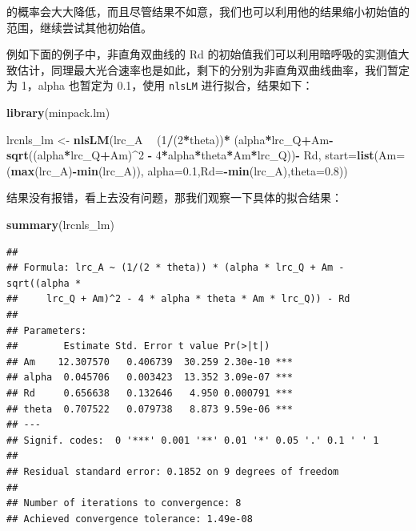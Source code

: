 \documentclass[]{krantz}
\makeatletter
\newenvironment{Shaded}{\begin{snugshade}}{\end{snugshade}}
\newcommand{\KeywordTok}[1]{\textcolor[rgb]{0.13,0.29,0.53}{\textbf{#1}}}
\newcommand{\DataTypeTok}[1]{\textcolor[rgb]{0.13,0.29,0.53}{#1}}
\newcommand{\DecValTok}[1]{\textcolor[rgb]{0.00,0.00,0.81}{#1}}
\newcommand{\FloatTok}[1]{\textcolor[rgb]{0.00,0.00,0.81}{#1}}
\newcommand{\StringTok}[1]{\textcolor[rgb]{0.31,0.60,0.02}{#1}}
\newcommand{\OperatorTok}[1]{\textcolor[rgb]{0.81,0.36,0.00}{\textbf{#1}}}
\newcommand{\NormalTok}[1]{#1}
\newenvironment{kframe}{%
\medskip{}
\setlength{\fboxsep}{.8em}
 \def\at@end@of@kframe{}%
 \ifinner\ifhmode%
  \def\at@end@of@kframe{\end{minipage}}%
  \begin{minipage}{\columnwidth}%
 \fi\fi%
 \def\FrameCommand##1{\hskip\@totalleftmargin \hskip-\fboxsep
 \colorbox{shadecolor}{##1}\hskip-\fboxsep
     \hskip-\linewidth \hskip-\@totalleftmargin \hskip\columnwidth}%
 \MakeFramed {\advance\hsize-\width
   \@totalleftmargin\z@ \linewidth\hsize
   \@setminipage}}%
 {\par\unskip\endMakeFramed%
 \at@end@of@kframe}
\renewenvironment{Shaded}{\begin{kframe}}{\end{kframe}}
\theoremstyle{definition}
\theoremstyle{definition}
\theoremstyle{definition}
\theoremstyle{remark}
\makeatother
\begin{document}
的概率会大大降低，而且尽管结果不如意，我们也可以利用他的结果缩小初始值的范围，继续尝试其他初始值。

例如下面的例子中，非直角双曲线的 Rd
的初始值我们可以利用暗呼吸的实测值大致估计，同理最大光合速率也是如此，剩下的分别为非直角双曲线曲率，我们暂定为
1，alpha 也暂定为 0.1，使用 \texttt{nlsLM} 进行拟合，结果如下：

\begin{Shaded}
\begin{Highlighting}[]
\KeywordTok{library}\NormalTok{(minpack.lm)}

\NormalTok{lrcnls_lm <-}\StringTok{ }\KeywordTok{nlsLM}\NormalTok{(lrc_A }\OperatorTok{~}\StringTok{ }\NormalTok{(}\DecValTok{1}\OperatorTok{/}\NormalTok{(}\DecValTok{2}\OperatorTok{*}\NormalTok{theta))}\OperatorTok{*}
\StringTok{        }\NormalTok{(alpha}\OperatorTok{*}\NormalTok{lrc_Q}\OperatorTok{+}\NormalTok{Am}\OperatorTok{-}\KeywordTok{sqrt}\NormalTok{((alpha}\OperatorTok{*}\NormalTok{lrc_Q}\OperatorTok{+}\NormalTok{Am)}\OperatorTok{^}\DecValTok{2} \OperatorTok{-}\StringTok{ }
\StringTok{        }\DecValTok{4}\OperatorTok{*}\NormalTok{alpha}\OperatorTok{*}\NormalTok{theta}\OperatorTok{*}\NormalTok{Am}\OperatorTok{*}\NormalTok{lrc_Q))}\OperatorTok{-}\StringTok{ }
\StringTok{        }\NormalTok{Rd, }\DataTypeTok{start=}\KeywordTok{list}\NormalTok{(}\DataTypeTok{Am=}\NormalTok{(}\KeywordTok{max}\NormalTok{(lrc_A)}\OperatorTok{-}\KeywordTok{min}\NormalTok{(lrc_A)),}
        \DataTypeTok{alpha=}\FloatTok{0.1}\NormalTok{,}\DataTypeTok{Rd=}\OperatorTok{-}\KeywordTok{min}\NormalTok{(lrc_A),}\DataTypeTok{theta=}\FloatTok{0.8}\NormalTok{)) }
\end{Highlighting}
\end{Shaded}

结果没有报错，看上去没有问题，那我们观察一下具体的拟合结果：

\begin{Shaded}
\begin{Highlighting}[]
\KeywordTok{summary}\NormalTok{(lrcnls_lm)}
\end{Highlighting}
\end{Shaded}

\begin{verbatim}
## 
## Formula: lrc_A ~ (1/(2 * theta)) * (alpha * lrc_Q + Am - sqrt((alpha * 
##     lrc_Q + Am)^2 - 4 * alpha * theta * Am * lrc_Q)) - Rd
## 
## Parameters:
##        Estimate Std. Error t value Pr(>|t|)    
## Am    12.307570   0.406739  30.259 2.30e-10 ***
## alpha  0.045706   0.003423  13.352 3.09e-07 ***
## Rd     0.656638   0.132646   4.950 0.000791 ***
## theta  0.707522   0.079738   8.873 9.59e-06 ***
## ---
## Signif. codes:  0 '***' 0.001 '**' 0.01 '*' 0.05 '.' 0.1 ' ' 1
## 
## Residual standard error: 0.1852 on 9 degrees of freedom
## 
## Number of iterations to convergence: 8 
## Achieved convergence tolerance: 1.49e-08
\end{verbatim}
\end{document}
